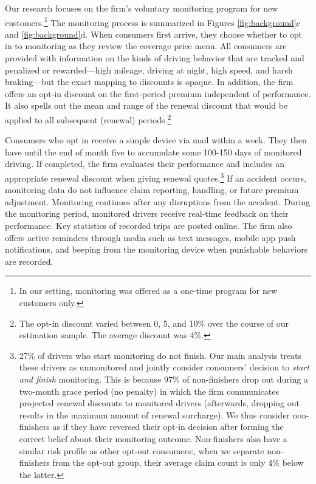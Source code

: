 Our research focuses on the firm's voluntary monitoring program for new customers.\footnote{In our setting, monitoring was offered as a one-time program for new customers only.} The monitoring process is summarized in Figures \ref{fig:background}c and \ref{fig:background}d. When consumers first arrive, they choose whether to opt in to monitoring as they review the coverage price menu. All consumers are provided with information on the kinds of driving behavior that are tracked and penalized or rewarded---high mileage, driving at night, high speed, and harsh braking---but the exact mapping to discounts is opaque. In addition, the firm offers an opt-in discount on the first-period premium independent of performance. It also spells out the mean and range of the renewal discount that would be applied to all subsequent (renewal) periods.\footnote{The opt-in discount varied between 0, 5, and 10\% over the course of our estimation sample. The average discount was 4\%.
}

Consumers who opt in receive a simple device via mail within a week. They then have until the end of month five to accumulate some 100-150 days of monitored driving. If completed, the firm evaluates their performance and includes an appropriate renewal discount when giving renewal quotes.\footnote{27\% of drivers who start monitoring do not finish. Our main analysis treats these drivers as unmonitored and jointly consider consumers' decision to \textit{start and finish} monitoring. This is because 97\% of non-finishers drop out during a two-month grace period (no penalty) in which the firm communicates projected renewal discounts to monitored drivers (afterwards, dropping out results in the maximum amount of renewal surcharge). We thus consider non-finishers as if they have reversed their opt-in decision after forming the correct belief about their monitoring outcome. Non-finishers also have a similar risk profile as other opt-out consumers:, when we separate non-finishers from the opt-out group, their average claim count is only 4\% below the latter.
}
If an accident occurs, monitoring data do not influence claim reporting, handling, or future premium adjustment. Monitoring continues after any disruptions from the accident.
During the monitoring period, monitored drivers receive real-time feedback on their performance. Key statistics of recorded trips are posted online. The firm also offers active reminders through media such as text messages, mobile app push notifications, and beeping from the monitoring device when punishable behaviors are recorded.

